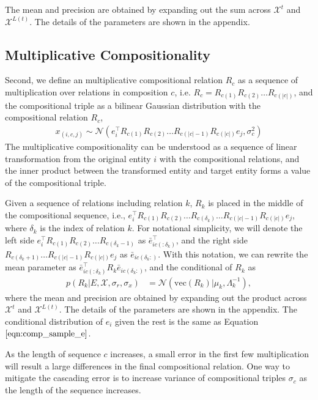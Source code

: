 The mean and precision are obtained by expanding out the sum across $\mathcal{X}^{t}$ and
$\mathcal{X}^{L(t)}$. The details of the parameters are shown in the appendix.


\subsection{Multiplicative Compositionality}
Second, we define an multiplicative compositional relation $R_c$ as a sequence of multiplication over
relations in composition $c$, i.e. $R_c = R_{c(1)} R_{c(2)} \dots R_{c(|c|)}$, and the compositional triple as a
bilinear Gaussian distribution with the compositional relation $R_c$,
\begin{align}
\label{eqn:multi}
x_{(i, c, j)} \sim \mathcal{N}(e_i^\top R_{c(1)}R_{c(2)} \dots R_{c(|c|-1)}R_{c(|c|)} e_j, \sigma_{c}^2)
\end{align}
The multiplicative compositionality can be understood as a sequence of linear transformation from the original
entity $i$ with the compositional relations, and the inner product between the transformed entity and target
entity forms a value of the compositional triple.

Given a sequence of relations including relation $k$, $R_k$ is placed in the middle of the compositional
sequence, i.e., $e_i^\top R_{c(1)}R_{c(2)} \dots R_{c(\delta_k)} \dots R_{c(|c|-1)}R_{c(|c|)} e_j$, where $
\delta_k$ is the index of relation $k$. For notational simplicity, we will denote the left side $e_i^\top R_{c(1)}
R_{c(2)} \dots R_{c(\delta_k -1)}$ as $\bar{e}_{ic(:\delta_k)}^\top$, and the right side $R_{c(\delta_k + 1)} \dots
R_{c(|c|-1)}R_{c(|c|)} e_j$ as $\bar{e}_{ic(\delta_k:)}$. With this notation, we can rewrite the mean parameter as $
\bar{e}_{ic(:\delta_k)}^\top R_{k} \bar{e}_{ic(\delta_k:)}$, and the conditional of $R_k$
as
\begin{align}
p(R_k|E, \mathcal{X}, \sigma_r, \sigma_x)  &= \mathcal{N}(\text{vec}(R_k) | \mu_k, \Lambda_k^{-1}),
\end{align}
where
the mean and precision are obtained by expanding out the product across $\mathcal{X}^{t}$ and
$\mathcal{X}^{L(t)}$. The details of the parameters are shown in the appendix.
The conditional distribution of $e_i$ given the rest is the same as Equation $\ref{eqn:comp_sample_e}$.

As the length of sequence $c$ increases, a small error in the first few multiplication will result a large
differences in the final compositional relation. One way to mitigate the cascading error is to increase variance
of compositional triples $\sigma_c$ as the length of the sequence increases.

